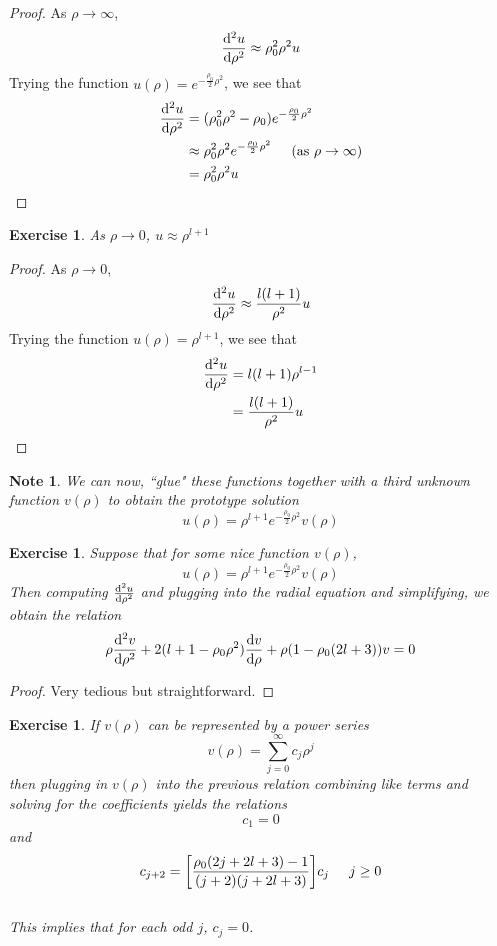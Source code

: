 \documentclass[12pt]{amsart}
\newtheorem{note}[thm]{Note}
\newtheorem{ex}[thm]{Exercise}
\begin{document}
\begin{proof}
As $\rho \rightarrow \infty$, $$\dv[2]{u}{\rho} \approx \rho_0^2 \rho^2u$$ Trying the function $u(\rho) = e^{-\frac{\rho_0}{2}\rho^2}$, we see that
\begin{align*}
\dv[2]{u}{\rho} 
&= (\rho_0^2 \rho^2 - \rho_0)e^{-\frac{\rho_0}{2}\rho^2}\\
& \approx \rho_0^2 \rho^2 e^{-\frac{\rho_0}{2}\rho^2} \hspace{.5cm} \text{(as }  \rho  \rightarrow \infty \text{)}\\
&=  \rho_0^2 \rho^2 u
\end{align*}
\end{proof}

\begin{ex}
As $\rho \rightarrow 0$, $u \approx \rho^{l+1}$
\end{ex}

\begin{proof}
As $\rho \rightarrow 0$, $$\dv[2]{u}{\rho} \approx \frac{l(l+1)}{\rho^2}u$$
Trying the function $u(\rho) = \rho^{l+1}$, we see that 
\begin{align*}
\dv[2]{u}{\rho} 
&= l(l+1)\rho^{l-1}\\
&= \frac{l(l+1)}{\rho^2}u
\end{align*}
\end{proof}

\begin{note}
We can now, ``glue" these functions together with a third unknown function $v(\rho)$ to obtain the prototype solution $$u(\rho) = \rho^{l+1}e^{-\frac{\rho_0}{2}\rho^2}v(\rho)$$
\end{note}

\begin{ex}
Suppose that for some nice function $v(\rho)$, $$u(\rho) = \rho^{l+1}e^{-\frac{\rho_0}{2}\rho^2}v(\rho)$$ Then computing $\dv[2]{u}{\rho}$ and plugging into the radial equation and simplifying, we obtain the relation $$\rho \dv[2]{v}{\rho} +2(l+1 - \rho_0\rho^2)\dv{v}{\rho} + \rho(1-\rho_0(2l+3))v = 0$$
\end{ex}

\begin{proof}
Very tedious but straightforward.
\end{proof}

\begin{ex}
If $v(\rho)$ can be represented by a power series $$v(\rho) = \sum_{j=0}^{\infty}c_j\rho^j$$ then plugging in $v(\rho)$ into the previous relation combining like terms and solving for the coefficients yields the relations $$c_1 = 0$$ and $$c_{j+2} = \bigg[ \frac{\rho_0(2j+2l+3)-1}{(j+2)(j+2l+3)}\bigg]c_j \hspace{5mm} j \geq 0$$ \vspace{3mm} \\This implies that for each odd $j$, $c_j = 0$. \vspace{3mm}
\end{ex}
\end{document}
